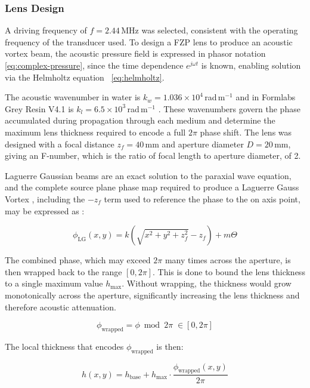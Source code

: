 \documentclass[11pt,a4paper]{article}
\begin{document}
\subsubsection{Lens Design}

A driving frequency of $f = 2.44$\,MHz was selected, consistent with the operating frequency of the transducer used. To design a FZP lens to produce an acoustic vortex beam, the acoustic pressure field is expressed in phasor notation \ref{eq:complex-pressure}, since the time dependence $e^{j\omega t}$ is known, enabling solution via the Helmholtz equation ~\ref{eq:helmholtz}. 

The acoustic wavenumber in water is $k_w = 1.036\times10^{4}$\,rad\,m$^{-1}$ and in Formlabs Grey Resin V4.1 is $k_l = 6.5\times10^{3}$\,rad\,m$^{-1}$ \cite{formlabsGreyV41}. These wavenumbers govern the phase accumulated during propagation through each medium and determine the maximum lens thickness required to encode a full $2\pi$ phase shift. The lens was designed with a focal distance $z_f = 40$\,mm and aperture diameter $D = 20$\,mm, giving an F-number, which is the ratio of focal length to aperture diameter, of 2. 

Laguerre Gaussian beams are an exact solution to the paraxial wave equation, and the complete source plane phase map required to produce a Laguerre Gauss Vortex , including the $-z_f$ term used to reference the phase to the on axis point, may be expressed as \cite{jimenez2018sharp}:

\begin{equation}
    \phi_{\mathrm{LG}}(x,y) = k\!\left(\sqrt{x^2+y^2+z_f^2} - z_f\right) + m\Theta
\label{eq:lgphase}
\end{equation}

\noindent The combined phase, which may exceed $2\pi$ many times across the aperture, is then wrapped back to the range $[0, 2\pi]$. This is done to bound the lens thickness to a single maximum value $h_{\max}$. Without wrapping, the thickness would grow monotonically across the aperture, significantly increasing the lens thickness and therefore acoustic attenuation.

\begin{equation}
    \phi_{\mathrm{wrapped}} = \phi \bmod 2\pi \;\in [0,2\pi]
\end{equation}

\noindent The local thickness that encodes $\phi_{\mathrm{wrapped}}$ is then:

\begin{equation}
    h(x,y) = h_{\mathrm{base}} 
    + h_{\max}\cdot\frac{\phi_{\mathrm{wrapped}}(x,y)}{2\pi}
\label{eq:thicknesseq}
\end{equation}
\end{document}
